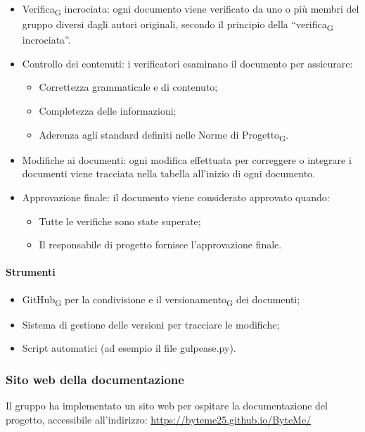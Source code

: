 \documentclass[11pt,a4paper]{article}
\newcommand{\gls}[1]{#1\textsubscript{G}}
\begin{document}
\begin{itemize}
    \item \gls{Verifica} incrociata: ogni documento viene verificato da uno o più membri del gruppo diversi dagli autori originali, secondo il principio della ``\gls{verifica} incrociata''.

    \item Controllo dei contenuti: i verificatori esaminano il documento per assicurare:
    \begin{itemize}
        \item Correttezza grammaticale e di contenuto;
        \item Completezza delle informazioni;
        \item Aderenza agli standard definiti nelle \gls{Norme di Progetto}.
    \end{itemize}

    \item Modifiche ai documenti: ogni modifica effettuata per correggere o integrare i documenti viene tracciata nella tabella all'inizio di ogni documento.

    \item Approvazione finale: il documento viene considerato approvato quando:
    \begin{itemize}
        \item Tutte le verifiche sono state superate;
        \item Il responsabile di progetto fornisce l’approvazione finale.
    \end{itemize}
\end{itemize}

\paragraph{Strumenti}

\begin{itemize}
    \item \gls{GitHub} per la condivisione e il \gls{versionamento} dei documenti;
    \item Sistema di gestione delle versioni per tracciare le modifiche;
    \item Script automatici (ad esempio il file gulpease.py).
\end{itemize}

\subsubsection{Sito web della documentazione}
Il gruppo ha implementato un sito web per ospitare la documentazione del progetto, accessibile all'indirizzo: \url{https://byteme25.github.io/ByteMe/}
\end{document}
